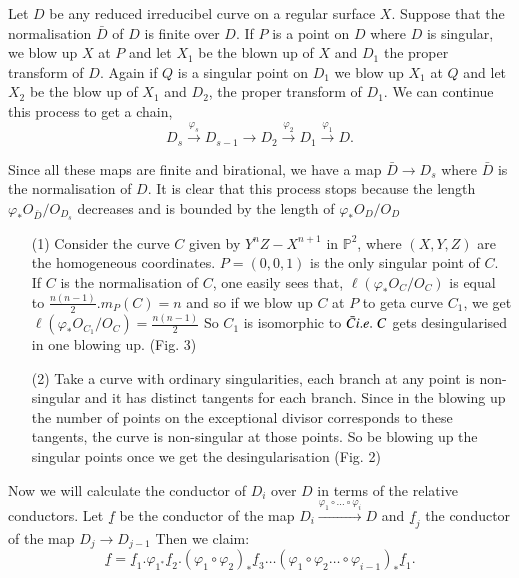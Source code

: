 Let $D$ be any reduced irreducibel curve on a regular surface
$X$. Suppose that the normalisation $\bar{D}$ of $D$ is finite over
$D$. If $P$ is a point on $D$ where $D$ is singular, we blow up $X$ at
$P$ and let $X_1$ be the blown up of $X$ and $D_1$ the proper
transform of $D$. Again if $Q$ is a singular point on $D_1$ we blow up
$X_1$ at $Q$ and let $X_2$ be the blow up of $X_1$ and $D_2$, the
proper transform of $D_1$. We can continue this process to get a chain,
$$
D_s\xrightarrow{\varphi_s}D_{s-1}\longrightarrow D_2
\xrightarrow{\varphi_2}D_1\xrightarrow{\varphi_1}D.
$$

Since all these maps are finite and birational, we have a map $\bar{D}
\longrightarrow D_s$ where $\bar{D}$ is the normalisation of $D$. It
is clear that this process stops because the length $\varphi_*
O_{\bar{D}}/O_{D_s}$ decreases and is bounded by the length of
$\varphi_* O_{D}/O_D$
\begin{Examples*}
\begin{itemize}
\item [(1)] Consider the curve $C$ given by $Y^nZ-X^{n+1}$ in
$\mathbb{P}^2$, where $(X, Y, Z)$ are the homogeneous
coordinates. $P=(0,0,1)$ is the only singular point of $C$. If $C$
is the normalisation of $C$, one easily sees that,
$\ell(\varphi_*O_{C}/O_C)$ is equal to $\frac{n(n-1)}{2}.m_P(C)=n$
and so if we blow up $C$ at $P$ to get\pageoriginale a curve $C_1$, we
get $\ell(\varphi_*O_{C_1}/O_C)=\frac{n(n-1)}{2}$ So $C_1$ is
isomorphic to $\bar{C} {i.e.}\kern.3em C$ gets desingularised in one blowing
up. (\cf Fig. 3)

\item [(2)] Take a curve with ordinary singularities, \ie each branch
  at any point is non-singular and it has distinct tangents for each
  branch. Since in the blowing up the number of points on the
  exceptional divisor corresponds to these tangents, the curve is
  non-singular at those points. So be blowing up the singular points
  once we get the desingularisation (\cf Fig. 2)  
\end{itemize}
\end{Examples*}

Now we will calculate the conductor of $D_i$ over $D$ in terms of the
relative conductors. Let $\underline{f}$ be the conductor of the map
$D_i\xrightarrow{\varphi_1\circ\ldots\circ\varphi_i}D$ and
$\underline{f}_j$ the conductor of the map $D_j\longrightarrow
D_{j-1}$ Then we claim:
$$
\underline{f}=\underline{f}_1.\varphi_{1^*}\underline{f}_2.(\varphi_1
\circ\varphi_2)_*\underline{f}_3\ldots(\varphi_1\circ\varphi_2\ldots\circ
\varphi_{i-1})_*\underline{f}_1.
$$

